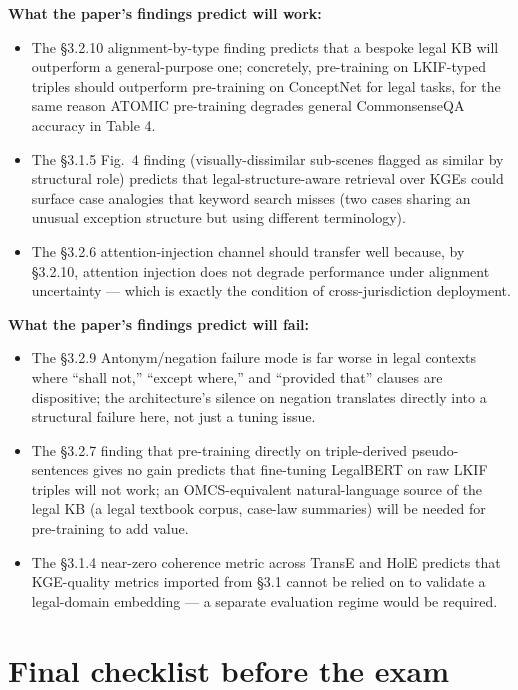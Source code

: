 \documentclass[11pt, a4paper]{article}
\begin{document}
\textbf{What the paper's findings predict will work:}
\begin{itemize}
  \item The §3.2.10 alignment-by-type finding predicts that a bespoke legal KB will outperform a general-purpose one; concretely, pre-training on LKIF-typed triples should outperform pre-training on ConceptNet for legal tasks, for the same reason ATOMIC pre-training degrades general CommonsenseQA accuracy in Table 4.
  \item The §3.1.5 Fig.\ 4 finding (visually-dissimilar sub-scenes flagged as similar by structural role) predicts that legal-structure-aware retrieval over KGEs could surface case analogies that keyword search misses (two cases sharing an unusual exception structure but using different terminology).
  \item The §3.2.6 attention-injection channel should transfer well because, by §3.2.10, attention injection does not degrade performance under alignment uncertainty — which is exactly the condition of cross-jurisdiction deployment.
\end{itemize}

\textbf{What the paper's findings predict will fail:}
\begin{itemize}
  \item The §3.2.9 Antonym/negation failure mode is far worse in legal contexts where ``shall not,'' ``except where,'' and ``provided that'' clauses are dispositive; the architecture's silence on negation translates directly into a structural failure here, not just a tuning issue.
  \item The §3.2.7 finding that pre-training directly on triple-derived pseudo-sentences gives no gain predicts that fine-tuning LegalBERT on raw LKIF triples will not work; an OMCS-equivalent natural-language source of the legal KB (a legal textbook corpus, case-law summaries) will be needed for pre-training to add value.
  \item The §3.1.4 near-zero coherence metric across TransE and HolE predicts that KGE-quality metrics imported from §3.1 cannot be relied on to validate a legal-domain embedding — a separate evaluation regime would be required.
\end{itemize}

\section{Final checklist before the exam}
\end{document}
